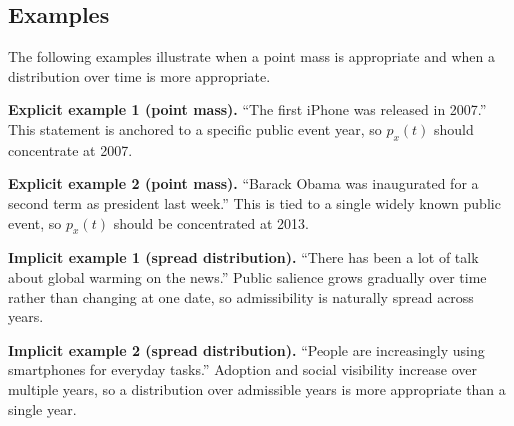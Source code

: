 \subsection{Examples}
The following examples illustrate when a point mass is appropriate and when a distribution over time is more appropriate.

\textbf{Explicit example 1 (point mass).}
``The first iPhone was released in 2007.''
This statement is anchored to a specific public event year, so $p_x(t)$ should concentrate at 2007.

\textbf{Explicit example 2 (point mass).}
``Barack Obama was inaugurated for a second term as president last week.''
This is tied to a single widely known public event, so $p_x(t)$ should be concentrated at 2013.

\textbf{Implicit example 1 (spread distribution).}
``There has been a lot of talk about global warming on the news.''
Public salience grows gradually over time rather than changing at one date, so admissibility is naturally spread across years.

\textbf{Implicit example 2 (spread distribution).}
``People are increasingly using smartphones for everyday tasks.''
Adoption and social visibility increase over multiple years, so a distribution over admissible years is more appropriate than a single year.
